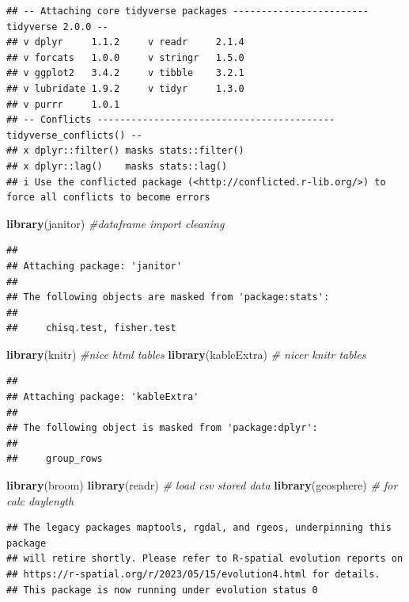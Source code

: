 \documentclass[
]{article}
\newenvironment{Shaded}{\begin{snugshade}}{\end{snugshade}}
\newcommand{\CommentTok}[1]{\textcolor[rgb]{0.56,0.35,0.01}{\textit{#1}}}
\newcommand{\FunctionTok}[1]{\textcolor[rgb]{0.13,0.29,0.53}{\textbf{#1}}}
\newcommand{\NormalTok}[1]{#1}
\begin{document}
\begin{verbatim}
## -- Attaching core tidyverse packages ------------------------ tidyverse 2.0.0 --
## v dplyr     1.1.2     v readr     2.1.4
## v forcats   1.0.0     v stringr   1.5.0
## v ggplot2   3.4.2     v tibble    3.2.1
## v lubridate 1.9.2     v tidyr     1.3.0
## v purrr     1.0.1     
## -- Conflicts ------------------------------------------ tidyverse_conflicts() --
## x dplyr::filter() masks stats::filter()
## x dplyr::lag()    masks stats::lag()
## i Use the conflicted package (<http://conflicted.r-lib.org/>) to force all conflicts to become errors
\end{verbatim}

\begin{Shaded}
\begin{Highlighting}[]
\FunctionTok{library}\NormalTok{(janitor) }\CommentTok{\#dataframe import cleaning}
\end{Highlighting}
\end{Shaded}

\begin{verbatim}
## 
## Attaching package: 'janitor'
## 
## The following objects are masked from 'package:stats':
## 
##     chisq.test, fisher.test
\end{verbatim}

\begin{Shaded}
\begin{Highlighting}[]
\FunctionTok{library}\NormalTok{(knitr) }\CommentTok{\#nice html tables}
\FunctionTok{library}\NormalTok{(kableExtra) }\CommentTok{\# nicer knitr tables}
\end{Highlighting}
\end{Shaded}

\begin{verbatim}
## 
## Attaching package: 'kableExtra'
## 
## The following object is masked from 'package:dplyr':
## 
##     group_rows
\end{verbatim}

\begin{Shaded}
\begin{Highlighting}[]
\FunctionTok{library}\NormalTok{(broom)}
\FunctionTok{library}\NormalTok{(readr) }\CommentTok{\# load csv stored data}
\FunctionTok{library}\NormalTok{(geosphere) }\CommentTok{\# for calc daylength}
\end{Highlighting}
\end{Shaded}

\begin{verbatim}
## The legacy packages maptools, rgdal, and rgeos, underpinning this package
## will retire shortly. Please refer to R-spatial evolution reports on
## https://r-spatial.org/r/2023/05/15/evolution4.html for details.
## This package is now running under evolution status 0
\end{verbatim}
\end{document}
